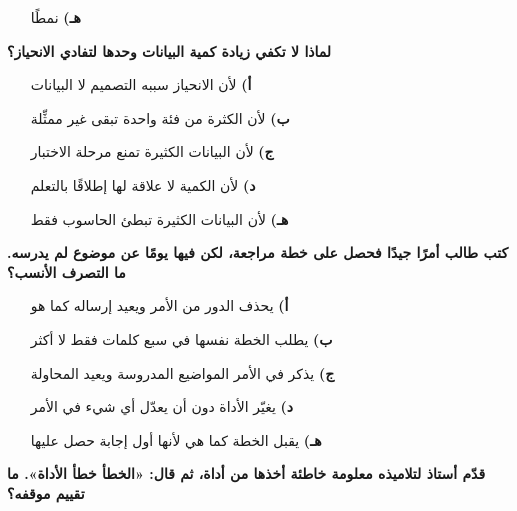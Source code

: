 \documentclass[11pt,a4paper]{article}
\begin{document}
\begin{multicols}{2}
\begin{minipage}{\linewidth}
\begin{itemize}[leftmargin=0.95cm, labelsep=4pt, itemsep=0pt, topsep=2pt, parsep=0pt]
  \item[\textbf{هـ)}] نمطًا
\end{itemize}
\end{minipage}\par\vspace{7pt plus 4pt}
\noindent\begin{minipage}{\linewidth}
\hangindent=0.7cm\textbf{لماذا لا تكفي زيادة كمية البيانات وحدها لتفادي الانحياز؟}
\begin{itemize}[leftmargin=0.95cm, labelsep=4pt, itemsep=0pt, topsep=2pt, parsep=0pt]
  \item[\textbf{أ)}] لأن الانحياز سببه التصميم لا البيانات
  \item[\textbf{ب)}] لأن الكثرة من فئة واحدة تبقى غير ممثِّلة
  \item[\textbf{ج)}] لأن البيانات الكثيرة تمنع مرحلة الاختبار
  \item[\textbf{د)}] لأن الكمية لا علاقة لها إطلاقًا بالتعلم
  \item[\textbf{هـ)}] لأن البيانات الكثيرة تبطئ الحاسوب فقط
\end{itemize}
\end{minipage}\par\vspace{7pt plus 4pt}
\noindent\begin{minipage}{\linewidth}
\hangindent=0.7cm\textbf{كتب طالب أمرًا جيدًا فحصل على خطة مراجعة، لكن فيها يومًا عن موضوع لم يدرسه. ما التصرف الأنسب؟}
\begin{itemize}[leftmargin=0.95cm, labelsep=4pt, itemsep=0pt, topsep=2pt, parsep=0pt]
  \item[\textbf{أ)}] يحذف الدور من الأمر ويعيد إرساله كما هو
  \item[\textbf{ب)}] يطلب الخطة نفسها في سبع كلمات فقط لا أكثر
  \item[\textbf{ج)}] يذكر في الأمر المواضيع المدروسة ويعيد المحاولة
  \item[\textbf{د)}] يغيّر الأداة دون أن يعدّل أي شيء في الأمر
  \item[\textbf{هـ)}] يقبل الخطة كما هي لأنها أول إجابة حصل عليها
\end{itemize}
\end{minipage}\par\vspace{7pt plus 4pt}
\noindent\begin{minipage}{\linewidth}
\hangindent=0.7cm\textbf{قدّم أستاذ لتلاميذه معلومة خاطئة أخذها من أداة، ثم قال: «الخطأ خطأ الأداة». ما تقييم موقفه؟}

\end{minipage}
\end{multicols}
\end{document}
